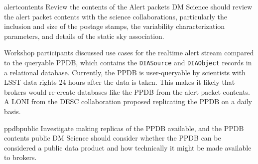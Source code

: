 \nrec
{alertcontents}
{Review the contents of the  {Alert} packets}
{DM Science should review the alert packet contents with the science collaborations, particularly the inclusion and size of the postage stamps, the variability characterization parameters, and details of the static sky association.}

Workshop participants discussed use cases for the realtime alert stream compared to the queryable  {PPDB}, which contains the \texttt{DIASource} and \texttt{DIAObject} records in a relational database.
Currently, the  {PPDB} is user-queryable by scientists with  {LSST} data rights 24 hours after the data is taken.
This makes it likely that brokers would re-create databases like the  {PPDB} from the alert packet contents.
A  {LONI} from the  {DESC} collaboration proposed replicating the  {PPDB} on a daily basis.

\nrec
{ppdbpublic}
{Investigate making replicas of the  {PPDB} available, and the  {PPDB} contents public}
{DM Science should consider whether the  {PPDB} can be considered a public data product and how technically it might be made available to brokers. 
}

